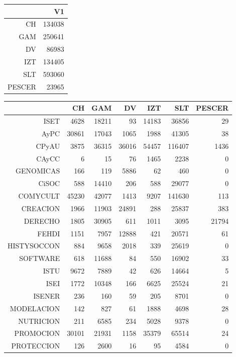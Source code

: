 \documentclass[12pt]{article}
\begin{document}
\begin{table}[ht]
\centering
\begin{tabular}{rr}
  \hline
 & V1 \\ 
  \hline
CH & 134038 \\ 
  GAM & 250641 \\ 
  DV & 86983 \\ 
  IZT & 134405 \\ 
  SLT & 593060 \\ 
  PESCER & 23965 \\ 
   \hline
\end{tabular}
\end{table}

\begin{table}[ht]
\centering
\begin{tabular}{rrrrrrr}
  \hline
 & CH & GAM & DV & IZT & SLT & PESCER \\ 
  \hline
ISET & 4628 & 18211 &  93 & 14183 & 36856 &  29 \\ 
  AyPC & 30861 & 17043 & 1065 & 1988 & 41305 &  38 \\ 
  CPyAU & 3875 & 36315 & 36016 & 54457 & 116407 & 1436 \\ 
  CAyCC &   6 &  15 &  76 & 1465 & 2238 &   0 \\ 
  GENOMICAS & 166 & 119 & 5886 &  62 & 460 &   0 \\ 
  CiSOC & 588 & 14410 & 206 & 588 & 29077 &   0 \\ 
  COMYCULT & 45230 & 42077 & 1413 & 9207 & 141630 & 113 \\ 
  CREACION & 1966 & 11903 & 24891 & 288 & 25837 & 383 \\ 
  DERECHO & 1805 & 30905 & 611 & 1011 & 3095 & 21794 \\ 
  FEHDI & 1151 & 7957 & 12888 & 421 & 20571 &  61 \\ 
  HISTYSOCCON & 884 & 9658 & 2018 & 339 & 25619 &   0 \\ 
  SOFTWARE & 618 & 11688 &  84 & 550 & 16902 &  33 \\ 
  ISTU & 9672 & 7889 &  42 & 626 & 14664 &   5 \\ 
  ISEI & 1772 & 10348 & 166 & 6625 & 25524 &  21 \\ 
  ISENER & 236 & 160 &  59 & 205 & 8701 &   0 \\ 
  MODELACION & 142 & 827 &  61 & 1888 & 4698 &  28 \\ 
  NUTRICION & 211 & 6585 & 234 & 5028 & 9378 &   0 \\ 
  PROMOCION & 30101 & 21931 & 1158 & 35379 & 65514 &  24 \\ 
  PROTECCION & 126 & 2600 &  16 &  95 & 4584 &   0 \\ 
   \hline
\end{tabular}
\end{table}
\end{document}
